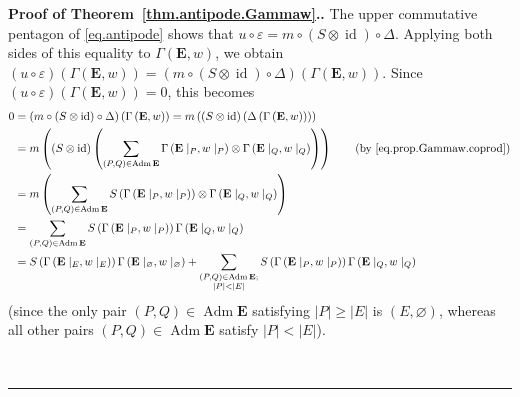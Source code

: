 \documentclass[numbers=enddot,12pt,final,onecolumn,notitlepage,abstracton]{scrartcl}
\theoremstyle{definition}
\newenvironment{proof}[1][Proof]{\noindent\textbf{#1.} }{\ \rule{0.5em}{0.5em}}
\let\sumnonlimits\sum
\renewcommand{\sum}{\sumnonlimits\limits}
\newenvironment{vershort}{}{}
\newcommand{\id}{{\operatorname{id}}}
\newcommand{\Adm}{\operatorname{Adm}}
\newcommand{\EE}{{\mathbf{E}}}
\begin{document}
\begin{proof}[Proof of Theorem~\ref{thm.antipode.Gammaw}.]
\begin{vershort}
The upper commutative pentagon of \eqref{eq.antipode} shows that
$u \circ \varepsilon = m \circ \left(S \otimes \id\right) \circ
\Delta$. Applying both sides of this equality to
$\Gamma\left(\EE, w\right)$, we obtain
$\left(u \circ \varepsilon\right)
\left(\Gamma\left(\EE, w\right)\right)
= \left(m \circ \left(S \otimes \id\right) \circ
\Delta\right) \left(\Gamma\left(\EE, w\right)\right)$.
Since
$\left(u \circ \varepsilon\right)
\left(\Gamma\left(\EE, w\right)\right) = 0$, this
becomes
\begin{align}
0
&= \left(m \circ \left(S \otimes \id\right) \circ
\Delta\right) \left(\Gamma\left(\EE, w\right)\right)
= m \left(\left(S \otimes \id\right) \left(
\Delta \left(\Gamma\left(\EE, w\right)\right)\right)\right)
\nonumber\\
&= m \left(\left(S \otimes \id\right) \left(
\sum_{\left(P, Q\right) \in \Adm \EE}
\Gamma\left(\EE\mid_P, w\mid_P\right)
\otimes \Gamma\left(\EE\mid_Q, w\mid_Q\right) \right) \right)
\qquad \left(\text{by \eqref{eq.prop.Gammaw.coprod}}\right)
\nonumber\\
&= m \left(\sum_{\left(P, Q\right) \in \Adm \EE}
S\left(\Gamma\left(\EE\mid_P, w\mid_P\right)\right)
\otimes
\Gamma\left(\EE\mid_Q, w\mid_Q\right)\right)
\nonumber\\
&= \sum_{\left(P, Q\right) \in \Adm \EE}
S\left(\Gamma\left(\EE\mid_P, w\mid_P\right)\right)
\Gamma\left(\EE\mid_Q, w\mid_Q\right)
\nonumber \\
&= S \left(\Gamma\left(\EE\mid_E, w\mid_E\right)\right)
\Gamma\left(\EE\mid_\varnothing, w\mid_\varnothing\right)
+ \sum_{\substack{\left(P, Q\right) \in \Adm \EE ; \\
                  \left|P\right| < \left|E\right|}}
S\left(\Gamma\left(\EE\mid_P, w\mid_P\right)\right)
\Gamma\left(\EE\mid_Q, w\mid_Q\right)
\label{pf.thm.antipode.Gammaw.Req.1}
\end{align}
(since the only pair $\left(P, Q\right) \in \Adm \EE$ satisfying
$\left|P\right| \geq \left|E\right|$ is $\left(E, \varnothing\right)$,
whereas all other pairs $\left(P, Q\right) \in \Adm \EE$
satisfy $\left|P\right| < \left|E\right|$).


\end{vershort}
\end{proof}
\end{document}
